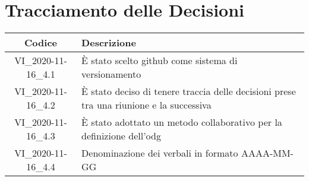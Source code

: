 \section*{Tracciamento delle Decisioni}

\begin{center}
	\begin{longtable}{|c|p{13cm}|}
	\hline
	\rowcolor{lighter-grayer}
	\textbf{Codice} & \textbf{Descrizione} \\
	\hline
	\endfirsthead

	\hline
	VI\_2020-11-16\_4.1 & È stato scelto github come sistema di versionamento \\
	\hline
	VI\_2020-11-16\_4.2 & È stato deciso di tenere traccia delle decisioni prese tra una riunione e la successiva \\
	\hline
	VI\_2020-11-16\_4.3 & È stato adottato un metodo collaborativo per la definizione dell'odg \\
	\hline
	VI\_2020-11-16\_4.4 & Denominazione dei verbali in formato AAAA-MM-GG \\
	\hline

	\end{longtable}
\end{center}
